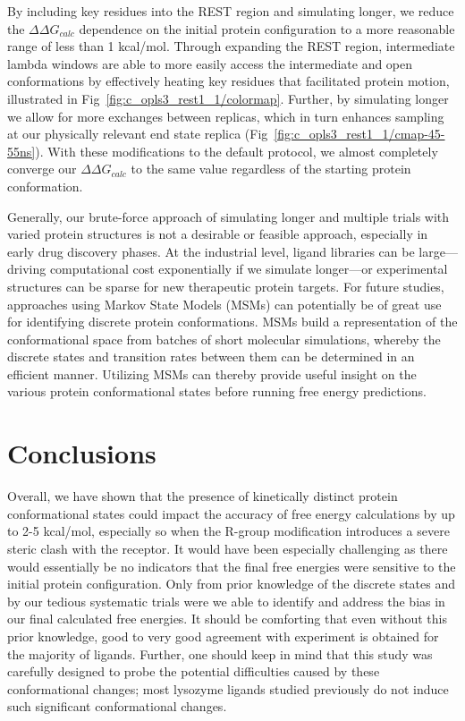 By including key residues into the REST region and simulating longer, we reduce the $\Delta\Delta G_{calc}$ dependence on the initial protein configuration to a more reasonable range of less than 1 kcal/mol.
Through expanding the REST region, intermediate lambda windows are able to more easily access the intermediate and open conformations by effectively heating key residues that facilitated protein motion, illustrated in Fig~\ref{fig:c_opls3_rest1_1/colormap}.
Further, by simulating longer we allow for more exchanges between replicas, which in turn enhances sampling at our physically relevant end state replica (Fig~\ref{fig:c_opls3_rest1_1/cmap-45-55ns}).
With these modifications to the default protocol, we almost completely converge our $\Delta\Delta G_{calc}$ to the same value regardless of the starting protein conformation.

Generally, our brute-force approach of simulating longer and multiple trials with varied protein structures is not a desirable or feasible approach, especially in early drug discovery phases.
At the industrial level, ligand libraries can be large---driving computational cost exponentially if we simulate longer---or experimental structures can be sparse for new therapeutic protein targets.
For future studies, approaches using Markov State Models (MSMs)\cite{MSM} can potentially be of great use for identifying discrete protein conformations.
MSMs build a representation of the conformational space from batches of short molecular simulations, whereby the discrete states and transition rates between them can be determined in an efficient manner.
Utilizing MSMs can thereby provide useful insight on the various protein conformational states before running free energy predictions.

\section{Conclusions}
Overall, we have shown that the presence of kinetically distinct protein conformational states could impact the accuracy of free energy calculations by up to 2-5 kcal/mol, especially so when the R-group modification introduces a severe steric clash with the receptor.
It would have been especially challenging as there would essentially be no indicators that the final free energies were sensitive to the initial protein configuration.
Only from prior knowledge of the discrete states and by our tedious systematic trials were we able to identify and address the bias in our final calculated free energies.
It should be comforting that even without this prior knowledge, good to very good agreement with experiment is obtained for the majority of ligands.
Further, one should keep in mind that this study was carefully designed to probe the potential difficulties caused by these conformational changes; most lysozyme ligands studied previously do not induce such significant conformational changes.

